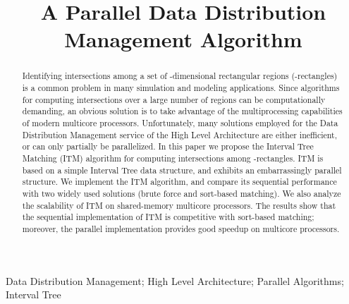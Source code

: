 \documentclass[10pt, conference, compsocconf]{IEEEtran}
\begin{document}
\title{A Parallel Data Distribution Management Algorithm\footnotemark}

\author{
\and
{}
}

\maketitle


\begin{abstract}
Identifying intersections among a set of -dimensional rectangular
regions (-rectangles) is a common problem in many simulation and
modeling applications. Since algorithms for computing intersections
over a large number of regions can be computationally demanding, an
obvious solution is to take advantage of the multiprocessing
capabilities of modern multicore processors. Unfortunately, many
solutions employed for the Data Distribution Management service of the
High Level Architecture are either inefficient, or can only partially
be parallelized. In this paper we propose the Interval Tree Matching
(ITM) algorithm for computing intersections among -rectangles. ITM
is based on a simple Interval Tree data structure, and exhibits an
embarrassingly parallel structure. We implement the ITM algorithm, and
compare its sequential performance with two widely used solutions
(brute force and sort-based matching). We also analyze the scalability
of ITM on shared-memory multicore processors. The results show that
the sequential implementation of ITM is competitive with sort-based
matching; moreover, the parallel implementation provides good speedup
on multicore processors.
\end{abstract}

\begin{IEEEkeywords}
Data Distribution Management; High Level Architecture; Parallel Algorithms; Interval Tree
\end{IEEEkeywords}
\end{document}
